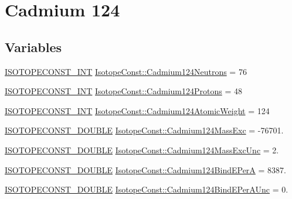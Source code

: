 \hypertarget{group___isotope_const-_cadmium-_cd124}{}\section{Cadmium 124}
\label{group___isotope_const-_cadmium-_cd124}
\subsection*{Variables}
\begin{DoxyCompactItemize}
\item 
\mbox{\hyperlink{group___isotope_const-_macros_ga5f18360b3e99483a35c32d789e62621c}{I\+S\+O\+T\+O\+P\+E\+C\+O\+N\+S\+T\+\_\+\+I\+NT}} \mbox{\hyperlink{group___isotope_const-_cadmium-_cd124_ga2d99835ad48c69fb861beeffafe6a40e}{Isotope\+Const\+::\+Cadmium124\+Neutrons}} = 76
\item 
\mbox{\hyperlink{group___isotope_const-_macros_ga5f18360b3e99483a35c32d789e62621c}{I\+S\+O\+T\+O\+P\+E\+C\+O\+N\+S\+T\+\_\+\+I\+NT}} \mbox{\hyperlink{group___isotope_const-_cadmium-_cd124_ga457f4f08060d5638558df7e7ed4eda6b}{Isotope\+Const\+::\+Cadmium124\+Protons}} = 48
\item 
\mbox{\hyperlink{group___isotope_const-_macros_ga5f18360b3e99483a35c32d789e62621c}{I\+S\+O\+T\+O\+P\+E\+C\+O\+N\+S\+T\+\_\+\+I\+NT}} \mbox{\hyperlink{group___isotope_const-_cadmium-_cd124_ga7c1d1c6f36aba07ed7b25632bab4e9bb}{Isotope\+Const\+::\+Cadmium124\+Atomic\+Weight}} = 124
\item 
\mbox{\hyperlink{group___isotope_const-_macros_ga8f45a7272ce02c0b4c65c44636ed719a}{I\+S\+O\+T\+O\+P\+E\+C\+O\+N\+S\+T\+\_\+\+D\+O\+U\+B\+LE}} \mbox{\hyperlink{group___isotope_const-_cadmium-_cd124_gaf07f33c21c5c9a097e0949e7863e9a22}{Isotope\+Const\+::\+Cadmium124\+Mass\+Exc}} = -\/76701.
\item 
\mbox{\hyperlink{group___isotope_const-_macros_ga8f45a7272ce02c0b4c65c44636ed719a}{I\+S\+O\+T\+O\+P\+E\+C\+O\+N\+S\+T\+\_\+\+D\+O\+U\+B\+LE}} \mbox{\hyperlink{group___isotope_const-_cadmium-_cd124_ga21e3c43783edb40cb96c1ed8819c8c6f}{Isotope\+Const\+::\+Cadmium124\+Mass\+Exc\+Unc}} = 2.
\item 
\mbox{\hyperlink{group___isotope_const-_macros_ga8f45a7272ce02c0b4c65c44636ed719a}{I\+S\+O\+T\+O\+P\+E\+C\+O\+N\+S\+T\+\_\+\+D\+O\+U\+B\+LE}} \mbox{\hyperlink{group___isotope_const-_cadmium-_cd124_ga403130d2270804fac908b5a2e02adb1c}{Isotope\+Const\+::\+Cadmium124\+Bind\+E\+PerA}} = 8387.
\item 
\mbox{\hyperlink{group___isotope_const-_macros_ga8f45a7272ce02c0b4c65c44636ed719a}{I\+S\+O\+T\+O\+P\+E\+C\+O\+N\+S\+T\+\_\+\+D\+O\+U\+B\+LE}} \mbox{\hyperlink{group___isotope_const-_cadmium-_cd124_ga8065e24eabbd6f2d9108d68a94b3faee}{Isotope\+Const\+::\+Cadmium124\+Bind\+E\+Per\+A\+Unc}} = 0.

\end{DoxyCompactItemize}
